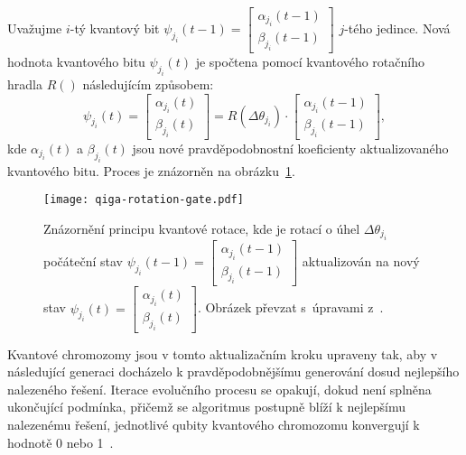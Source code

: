 Uvažujme $i$-tý kvantový bit $\psi_{j_i}\left(t-1\right) = \begin{bmatrix} \alpha_{j_i}\left(t-1\right) \\ \beta_{j_i}\left(t-1\right) \end{bmatrix}$ $j$-tého jedince. 
Nová hodnota kvantového bitu $\psi_{j_i}\left(t\right)$ je spočtena pomocí kvantového rotačního hradla $R\left(\right)$ následujícím způsobem:
\begin{equation*}\label{eq:qiga-rotation-gate-angles}
    \psi_{j_i}\left(t\right) =
    \begin{bmatrix}
        \alpha_{j_i}\left(t\right) \\
        \beta_{j_i}\left(t\right)
    \end{bmatrix}
    =
    R\left(\Delta\theta_{j_i}\right) \cdot
    \begin{bmatrix}
        \alpha_{j_i}\left(t-1\right) \\
        \beta_{j_i}\left(t-1\right) 
    \end{bmatrix},
\end{equation*}
kde $\alpha_{j_i}\left(t\right)$ a $\beta_{j_i}\left(t\right)$ jsou nové pravděpodobnostní koeficienty aktualizovaného kvantového bitu. Proces je znázorněn na obrázku~\ref{fig:qiga-rotation-gate}.

\begin{figure}[ht!]
    \centering
    \texttt{[image: qiga-rotation-gate.pdf]}
    \caption{Znázornění principu kvantové rotace, kde je rotací o úhel $\Delta\theta_{j_i}$ počáteční stav $\psi_{j_i}\left(t-1\right) = \begin{bmatrix} \alpha_{j_i}\left(t-1\right) \\ \beta_{j_i}\left(t-1\right) \end{bmatrix}$ aktualizován na nový stav $\psi_{j_i}\left(t\right) = \begin{bmatrix} \alpha_{j_i}\left(t\right) \\ \beta_{j_i}\left(t\right) \end{bmatrix}$. Obrázek převzat s~úpravami z~\cite{qisa}.}
    \label{fig:qiga-rotation-gate}
\end{figure}

Kvantové chromozomy jsou v tomto aktualizačním kroku upraveny tak, aby v následující generaci docházelo k pravděpodobnějšímu generování dosud nejlepšího nalezeného řešení. 
Iterace evolučního procesu se opakují, dokud není splněna ukončující podmínka, přičemž se algoritmus postupně blíží k nejlepšímu nalezenému řešení, jednotlivé qubity kvantového chromozomu konvergují k hodnotě 0 nebo 1~\cite{NaturalComputing,qiga}.


